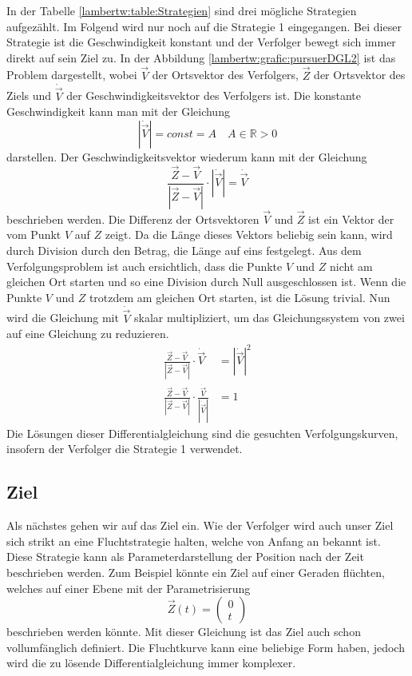 In der Tabelle \eqref{lambertw:table:Strategien} sind drei mögliche Strategien aufgezählt.
Im Folgend wird nur noch auf die Strategie 1 eingegangen.
Bei dieser Strategie ist die Geschwindigkeit konstant und der Verfolger bewegt sich immer direkt auf sein Ziel zu.
In der Abbildung \eqref{lambertw:grafic:pursuerDGL2} ist das Problem dargestellt,
wobei $\vec{V}$ der Ortsvektor des Verfolgers, $\vec{Z}$ der Ortsvektor des Ziels und $\dot{\vec{V}}$ der Geschwindigkeitsvektor des Verfolgers ist.
Die konstante Geschwindigkeit kann man mit der Gleichung
\begin{equation}
    |\dot{\vec{V}}|
    = const = A
    \quad A\in\mathbb{R}>0
\end{equation}
darstellen. Der Geschwindigkeitsvektor wiederum kann mit der Gleichung
\begin{equation}
    \frac{\vec{Z}-\vec{V}}{|\vec{Z}-\vec{V}|}\cdot|\dot{\vec{V}}|
    =
    \dot{\vec{V}}
\end{equation}
beschrieben werden.
Die Differenz der Ortsvektoren $\vec{V}$ und $\vec{Z}$ ist ein Vektor der vom Punkt $V$ auf $Z$ zeigt.
Da die Länge dieses Vektors beliebig sein kann, wird durch Division durch den Betrag, die Länge auf eins festgelegt.
Aus dem Verfolgungsproblem ist auch ersichtlich, dass die Punkte $V$ und $Z$ nicht am gleichen Ort starten und so eine Division durch Null ausgeschlossen ist.
Wenn die Punkte $V$ und $Z$ trotzdem am gleichen Ort starten, ist die Lösung trivial.
Nun wird die Gleichung mit $\dot{\vec{V}}$ skalar multipliziert, um das Gleichungssystem von zwei auf eine Gleichung zu reduzieren.
\begin{align}
    \label{lambertw:pursuerDGL}
    \frac{\vec{Z}-\vec{V}}{|\vec{Z}-\vec{V}|}\cdot
    \dot{\vec{V}}
    &=
    |\dot{\vec{V}}|^2
    \\
    \frac{\vec{Z}-\vec{V}}{|\vec{Z}-\vec{V}|}\cdot \frac{\dot{\vec{V}}}{|\dot{\vec{V}}|}
    &=
    1
\end{align}
Die Lösungen dieser Differentialgleichung sind die gesuchten Verfolgungskurven, insofern der Verfolger die Strategie 1 verwendet.

\subsection{Ziel
\label{lambertw:subsection:Ziel}}
Als nächstes gehen wir auf das Ziel ein.
Wie der Verfolger wird auch unser Ziel sich strikt an eine Fluchtstrategie halten, welche von Anfang an bekannt ist.
Diese Strategie kann als Parameterdarstellung der Position nach der Zeit beschrieben werden.
Zum Beispiel könnte ein Ziel auf einer Geraden flüchten, welches auf einer Ebene mit der Parametrisierung
\begin{equation}
    \vec{Z}(t)
    =
    \left( \begin{array}{c} 0 \\  t \end{array} \right)
\end{equation}
beschrieben werden könnte.
Mit dieser Gleichung ist das Ziel auch schon vollumfänglich definiert.
Die Fluchtkurve kann eine beliebige Form haben, jedoch wird die zu lösende Differentialgleichung immer komplexer.




